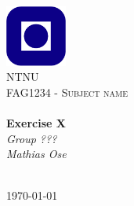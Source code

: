 \begin{titlepage}
\begin{center}
\includegraphics[width=0.15\textwidth]{img/NTNU.png}~\\[1cm]

\textsc{\LARGE NTNU}\\[1.5cm]

\textsc{\Large FAG1234 - Subject name}\\[0.5cm]

\HRule \\[0.4cm]
{ \huge \bfseries Exercise X}\\[0.5cm]
{\Large \textit{Group ???}}\\[0.3cm]
{\large \textit{Mathias Ose}}\\[0.2cm]
\HRule \\[1.5cm]



\vfill

{\large \today}
\end{center}
\end{titlepage}

